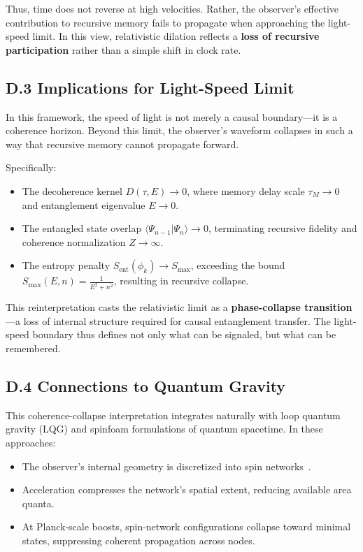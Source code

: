 Thus, time does not reverse at high velocities. Rather, the observer’s effective contribution to recursive memory fails to propagate when approaching the light-speed limit. In this view, relativistic dilation reflects a \textbf{loss of recursive participation} rather than a simple shift in clock rate.

\subsection*{D.3 Implications for Light-Speed Limit}

In this framework, the speed of light is not merely a causal boundary—it is a coherence horizon. Beyond this limit, the observer's waveform collapses in such a way that recursive memory cannot propagate forward.

Specifically:
\begin{itemize}
    \item The decoherence kernel \( D(\tau, E) \to 0 \), where memory delay scale \( \tau_M \to 0 \) and entanglement eigenvalue \( E \to 0 \).
    \item The entangled state overlap \( \langle \Psi_{n-1} | \Psi_n \rangle \to 0 \), terminating recursive fidelity and coherence normalization \( Z \to \infty \).
    \item The entropy penalty \( S_{\text{ent}}(\phi_k) \to S_{\text{max}} \), exceeding the bound \( S_{\text{max}}(E,n) = \frac{1}{E^2 + n^2} \), resulting in recursive collapse.
\end{itemize}

This reinterpretation casts the relativistic limit as a \textbf{phase-collapse transition}—a loss of internal structure required for causal entanglement transfer. The light-speed boundary thus defines not only what can be signaled, but what can be remembered.

\subsection*{D.4 Connections to Quantum Gravity}

This coherence-collapse interpretation integrates naturally with loop quantum gravity (LQG) and spinfoam formulations of quantum spacetime. In these approaches:
\begin{itemize}
    \item The observer's internal geometry is discretized into spin networks~\cite{rovelli2004quantum}.
    \item Acceleration compresses the network's spatial extent, reducing available area quanta.
    \item At Planck-scale boosts, spin-network configurations collapse toward minimal states, suppressing coherent propagation across nodes.
\end{itemize}

